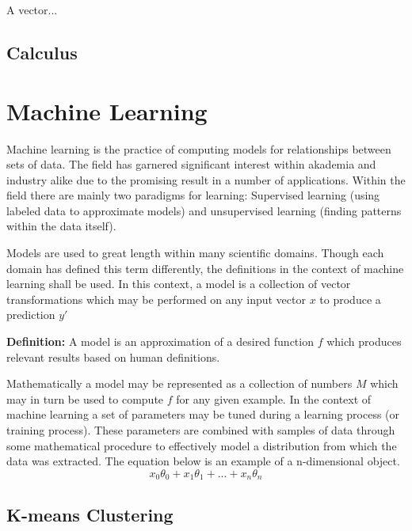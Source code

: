 A vector...

\subsection{Calculus}


\section{Machine Learning}

Machine learning is the practice of computing models for relationships between sets of data. The field has garnered significant interest within akademia and industry alike due to the promising result in a number of applications. Within the field there are mainly two paradigms for learning: Supervised learning (using labeled data to approximate models) and unsupervised learning (finding patterns within the data itself). 

Models are used to great length within many scientific domains. Though each domain has defined this term differently, the definitions in the context of machine learning shall be used. In this context, a model is a collection of vector transformations which may be performed on any input vector $x$ to produce a prediction $y'$

\vspace{5mm}

\textbf{Definition: } A model is an approximation of a desired function $f$ which produces relevant results based on human definitions.  

\vspace{5mm}

Mathematically a model may be represented as a collection of numbers $M$ which may in turn be used to compute $f$ for any given example.
In the context of machine learning a set of parameters may be tuned during a learning process (or training process). These parameters are combined with samples of data through some mathematical procedure to effectively model a distribution from which the data was extracted. The equation below is an example of a n-dimensional object.
$$x_0\theta_0 + x_1\theta_1 + ... + x_n\theta_n$$

\subsection{K-means Clustering}

